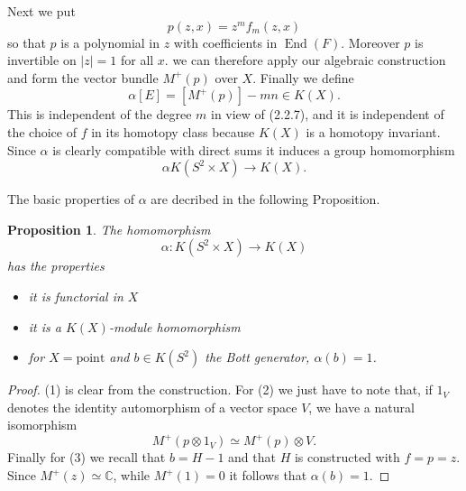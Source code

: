 \documentclass[leqno]{book}
\numberwithin{equation}{section}
\newtheorem{proposition}[theorem]{Proposition}
\theoremstyle{definition}
\begin{document}
            Next we put
            \begin{equation*}
              p(z,x)=z^{m}f_{m}(z,x)
            \end{equation*}
            so that $p$ is a polynomial in $z$ with coefficients in $\operatorname{End}(F)$. Moreover $p$ is invertible on $|z|=1$ for all $x$. we can therefore apply our algebraic construction and form the vector bundle $M^{+}(p)$ over $X$. Finally we define
            \begin{equation*}
              \alpha[E]=[M^{+}(p)]-mn \in K(X).
            \end{equation*}
            This is independent of the degree $m$ in view of (2.2.7), and it is independent of the choice of $f$ in its homotopy class because $K(X)$ is a homotopy invariant. Since $\alpha$ is clearly compatible with direct sums it induces a group homomorphism
            \begin{equation*}
              \alpha K(S^{2}\times X)\to K(X).
            \end{equation*}

            The basic properties of $\alpha$ are decribed in the following Proposition.

            \begin{proposition}
              The homomorphism
              \begin{equation*}
                \alpha:K(S^{2}\times X)\to K(X)
              \end{equation*}
              has the properties
              \begin{itemize}
                \item [(1)] it is functorial in $X$
                \item [(2)] it is a $K(X)$-module homomorphism
                \item [(3)] for $X=\text{point}$ and $b \in K(S^{2})$ the Bott generator, $\alpha(b)=1$.
              \end{itemize}
            \end{proposition}

            \begin{proof}
              (1) is clear from the construction. For (2) we just have to note that, if $1_{V}$ denotes the identity automorphism of a vector space $V$, we have a natural isomorphism
              \begin{equation*}
                M^{+}(p\otimes 1_{V})\simeq M^{+}(p)\otimes V.
              \end{equation*}
              Finally for (3) we recall that $b=H-1$ and that $H$ is constructed with $f=p=z$. Since $M^{+}(z)\simeq \mathbb{C}$, while $M^{+}(1)=0$ it follows that $\alpha(b)=1$.
            \end{proof}
\end{document}

